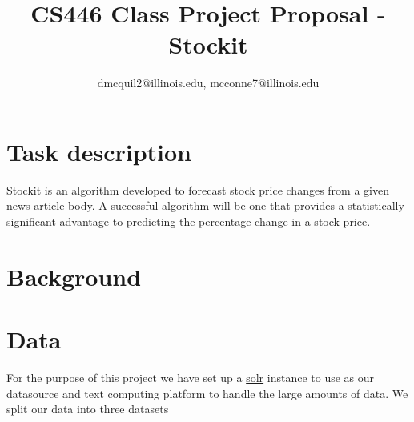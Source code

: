 \documentclass[11pt,letterpaper]{article}
\newcommand{\blue}[1]{\textcolor{RoyalBlue}{#1}}
\newcommand{\instructions}[1]{\blue{\textit{#1}}}
\renewcommand{\instructions}[1]{}
\begin{document}
\title{CS446 Class Project Proposal - Stockit}
\author{dmcquil2@illinois.edu, mcconne7@illinois.edu}
\maketitle



\instructions{If you are taking CS446 for 4 hours credit, you need to
  do a research project.\\
This is a \LaTeX template for the initial proposal,  but should also give you a start on the final report.\\
The blue pieces of text  in this template are either instructions ({\tt$\backslash$instructions\{...\}}) or indicate where you need to fill in something ({\tt$\backslash$fillme\{...\}}).  
You should replace all the {\tt$\backslash$fillme\{...\}} commands with your own text.
To make the instructions disappear, please uncomment the 
\begin{center}
{\tt$\backslash$renewcommand\{$\backslash$instructions\}[1]\{\}}\\
\end{center}
lines in the preamble (just above  {\tt $\backslash$begin\{document\}} of this .tex file) by removing the leading \% marks, 
recompile (run \LaTeX again) and submit the PDF on Compass.\\
The template for the final report is at
\url{http://courses.engr.illinois.edu/cs446/Projects/CS446proj.tex}
(or
\url{http://courses.engr.illinois.edu/cs446/Projects/CS446proj.pdf}
for the pdf)
}
\section*{Task description}
  Stockit is an algorithm developed to forecast stock price changes from
  a given news article body. A successful algorithm will be one that provides
  a statistically significant advantage to predicting the percentage change
  in a stock price.
\instructions{Describe the task you want to tackle in your project.}

\section*{Background}
\instructions{Has there been any prior work on this task? If so,
  provide references where available}

\section*{Data}
  For the purpose of this project we have set up a \href{http://lucene.apache.org/solr/}{solr} instance to use as our datasource and text computing platform to handle the large amounts of data.  We split our data into three datasets
  
\end{document}
